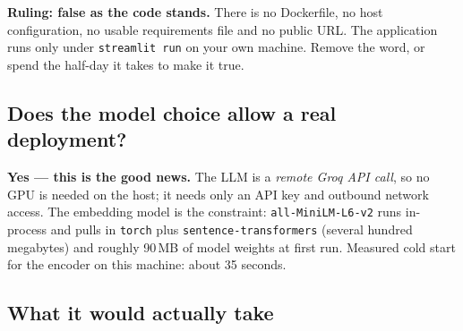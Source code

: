 \documentclass[11pt,a4paper]{article}
\begin{document}
\textbf{Ruling: false as the code stands.} There is no Dockerfile, no host
configuration, no usable requirements file and no public URL. The application
runs only under \texttt{streamlit run} on your own machine. Remove the word, or
spend the half-day it takes to make it true.

\subsection{Does the model choice allow a real deployment?}

\textbf{Yes --- this is the good news.} The LLM is a \emph{remote Groq API call},
so no GPU is needed on the host; it needs only an API key and outbound network
access. The embedding model is the constraint: \texttt{all-MiniLM-L6-v2} runs
in-process and pulls in \texttt{torch} plus \texttt{sentence-transformers}
(several hundred megabytes) and roughly 90\,MB of model weights at first run.
Measured cold start for the encoder on this machine: about 35 seconds.

\subsection{What it would actually take}
\end{document}
